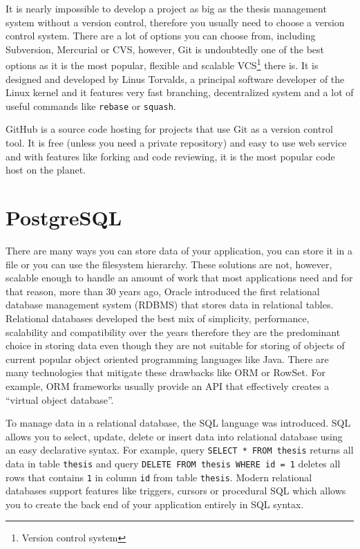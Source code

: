 It is nearly impossible to develop a project as big as the thesis management system without a version control, therefore you usually need to choose a version control system. There are a lot of options you can choose from, including Subversion, Mercurial or CVS, however, Git is undoubtedly one of the best options as it is the most popular, flexible and scalable VCS\footnote{Version control system} there is. It is designed and developed by Linus Torvalds, a principal software developer of the Linux kernel and it features very fast branching, decentralized system and a lot of useful commands like \texttt{rebase} or \texttt{squash}.

GitHub is a source code hosting for projects that use Git as a version control tool. It is free (unless you need a private repository) and easy to use web service and with features like forking and code reviewing, it is the most popular code host on the planet\cite{github-features}.

\section{PostgreSQL}

There are many ways you can store data of your application, you can store it in a file or you can use the filesystem hierarchy. These solutions are not, however, scalable enough to handle an amount of work that most applications need and for that reason, more than 30 years ago, Oracle introduced the first relational database management system (RDBMS) that stores data in relational tables. Relational databases developed the best mix of simplicity, performance, scalability and compatibility over the years therefore they are the predominant choice in storing data even though they are not suitable for storing of objects of current popular object oriented programming languages like Java. There are many technologies that mitigate these drawbacks like ORM or RowSet. For example, ORM frameworks usually provide an API that effectively creates a ``virtual object database''.

To manage data in a relational database, the SQL language was introduced. SQL allows you to select, update, delete or insert data into relational database using an easy declarative syntax. For example, query \texttt{SELECT * FROM thesis} returns all data in table \texttt{thesis} and query \texttt{DELETE FROM thesis WHERE id = 1} deletes all rows that contains \texttt{1} in column \texttt{id} from table \texttt{thesis}. Modern relational databases support features like triggers, cursors or procedural SQL which allows you to create the back end of your application entirely in SQL syntax.

